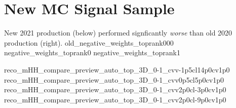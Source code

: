 \section{New MC Signal Sample}
{ \small
    New 2021 production (below) performed signficantly \textit{worse} than old 2020 production (right).
}
{old_negative_weights_toprank000}
{negative_weights_toprank0}
{negative_weights_toprank1}

{reco_mHH_compare_preview_auto_top_3D_0-1_cvv-1p5cl14p0cv1p0}
{reco_mHH_compare_preview_auto_top_3D_0-1_cvv0p5cl5p0cv1p0}
{reco_mHH_compare_preview_auto_top_3D_0-1_cvv2p0cl-3p0cv1p0}
{reco_mHH_compare_preview_auto_top_3D_0-1_cvv2p0cl-9p0cv1p0}
